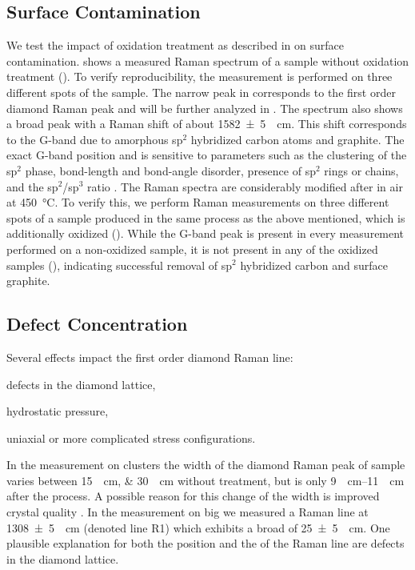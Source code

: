 			\subsection{Surface Contamination}\label{subsec::raman_surface_contamination}

				We test the impact of oxidation treatment as described in  on surface contamination.
				 shows a measured Raman spectrum of a sample without oxidation treatment (\insituSn).
				To verify reproducibility, the measurement is performed on three different spots of the sample.
				The narrow peak in  corresponds to the first order diamond Raman peak and will be further analyzed in .
				The spectrum also shows a broad peak with a Raman shift of about \SI[separate-uncertainty]{1582+-5}{\per\centi\meter}.
				This shift corresponds to the G-band due to amorphous sp$^2$ hybridized carbon atoms and graphite.
				The exact G-band position and \lw is sensitive to parameters such as the clustering of the sp$^2$ phase, bond-length and bond-angle disorder, presence of sp$^2$ rings or chains, and the sp$^2$/sp$^3$ ratio \cite{ferrari2004raman}.
				The \nd Raman spectra are considerably modified after \ox in air at \SI{450}{\degreeCelsius}.
				To verify this, we perform Raman measurements on three different spots of a sample produced in the same process as the above mentioned, which is additionally oxidized (\insituSo).
				While the G-band peak is present in every measurement performed on a non-oxidized sample, it is not present in any of the oxidized samples (), indicating successful removal of sp$^2$ hybridized carbon and surface graphite.

			\subsection{Defect Concentration}\label{subsec::raman_defect_concentration}
				
				Several effects impact the first order diamond Raman line:
				\begin{enumerate*}
					\item defects in the diamond lattice,
					\item hydrostatic pressure,
					\item uniaxial or more complicated stress configurations.
				\end{enumerate*}
				In the measurement on \nd clusters the width of the diamond Raman peak of sample \insituS varies between \SIlist{15; 30}{\per\centi\meter} without \ox treatment, but is only \SIrange{9}{11}{\per\centi\meter} after the \ox process.
				A possible reason for this change of the width is improved crystal quality \cite{Prawer2004}.
				In the measurement on big \nds we measured a Raman line at \SI[separate-uncertainty]{1308+-5}{\per\centi\meter} (denoted line R1) which exhibits a broad \lw of \SI[separate-uncertainty]{25+-5}{\per\centi\meter}.
				One plausible explanation for both the position and the \lw of the Raman line are defects in the diamond lattice\cite{Prawer2004}.

